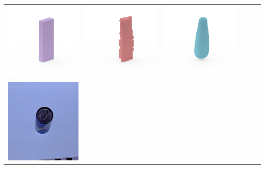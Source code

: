 \documentclass[10pt,onecolumn,letterpaper]{article}
\begin{document}
\begin{tabular}{cccccc}
\includegraphics[height=\turnheight, clip=true, trim=60 30 30 5]{vo5_extra_body_volumizing_shampoo_NP2_216_bb_view_0.png} &
\includegraphics[height=\turnheight, clip=true, trim=60 30 30 5]{vo5_extra_body_volumizing_shampoo_NP2_216_zheng_view_0.png} &
\includegraphics[height=\turnheight, clip=true, trim=60 30 30 5]{vo5_extra_body_volumizing_shampoo_NP2_216_oma_view_0} \\
\includegraphics[height=\turnheight, clip=true, trim=20 30 30 5]{red_bull.png} &

\end{tabular}
\end{document}
